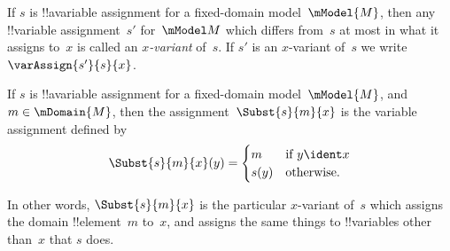 \documentclass[../../../include/open-logic-section]{subfiles}
\begin{document}
\begin{defn}[$x$-Variant]
If $s$ is !!a{variable} assignment for a fixed-domain model~$\mModel{M}$, 
then any !!{variable} assignment~$s'$ for~$\mModel M$ which differs from~$s$ at most
in what it assigns to~$x$ is called an \emph{$x$-variant} of~$s$.  If
$s'$ is an $x$-variant of~$s$ we write $\varAssign{s'}{s}{x}$.
\end{defn}

\begin{defn}
  If $s$ is !!a{variable} assignment for a fixed-domain model~$\mModel{M}$, 
  and $m \in \mDomain{M}$, then the assignment~$\Subst{s}{m}{x}$ is the
  variable assignment defined by
  \[\Subst{s}{m}{x}(y) = \begin{cases}
    m & \text{if } y \ident x\\
    s(y) & \text{otherwise}.
  \end{cases}\]
\end{defn}

In other words, $\Subst{s}{m}{x}$ is the particular $x$-variant of~$s$
which assigns the domain !!{element}~$m$ to~$x$, and assigns the same
things to !!{variable}s other than~$x$ that $s$ does.
\end{document}
